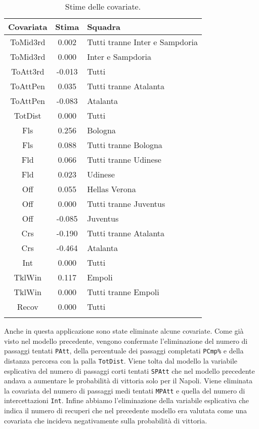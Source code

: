 \begin{table}[]%
	
	\renewcommand{\arraystretch}{1.7}
	\centering
	\begin{tabular}{ccp{10cm}}
		\hline	
		
		\textbf{Covariata} & \textbf{Stima} & \textbf{Squadra} \\	
		\hline
		ToMid3rd & 0.002 & Tutti tranne Inter e Sampdoria\\
		ToMid3rd & 0.000 & Inter e Sampdoria\\
		ToAtt3rd & -0.013 & Tutti \\  
		ToAttPen & 0.035 & Tutti tranne Atalanta \\    
		ToAttPen & -0.083 & Atalanta \\ 	     	 
		TotDist & 0.000 & Tutti \\	
		Fls & 0.256 & Bologna  \\
		Fls & 0.088 & Tutti tranne Bologna \\ 		
		Fld & 0.066 & Tutti tranne Udinese \\
		Fld & 0.023 & Udinese \\
		Off & 0.055 & Hellas Verona\\
		Off & 0.000 & Tutti tranne Juventus\\
		Off & -0.085 & Juventus  \\
		Crs & -0.190 & Tutti tranne Atalanta\\
		Crs & -0.464 & Atalanta \\
		Int & 0.000 & Tutti\\
		TklWin &  0.117 & Empoli  \\
		TklWin &  0.000 & Tutti tranne Empoli  \\ 
		Recov &  0.000 & Tutti \\ 
		\hline
		& &  \\
		
	\end{tabular} \hbox{}
	\caption{Stime delle covariate.} \label{tab:BTCLI3} 
	
\end{table}
Anche in questa applicazione sono state eliminate alcune covariate. Come già visto nel modello precedente, vengono confermate l'eliminazione del numero di passaggi tentati \texttt{PAtt}, della percentuale dei passaggi completati \texttt{PCmp\%} e della distanza percorsa con la palla \texttt{TotDist}. Viene tolta dal modello la variabile esplicativa del numero di passaggi corti tentati \texttt{SPAtt} che nel modello precedente andava a aumentare le probabilità di vittoria solo per il Napoli. Viene eliminata la covariata del numero di passaggi medi tentati \texttt{MPAtt} e quella del numero di intercettazioni \texttt{Int}. Infine abbiamo l'eliminazione della variabile esplicativa che indica il numero di recuperi che nel precedente modello era valutata come una covariata che incideva negativamente sulla probabilità di vittoria.\\

